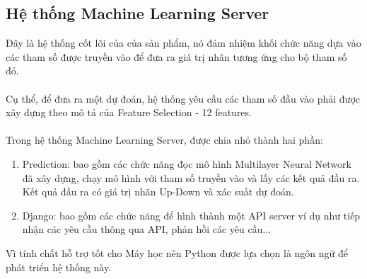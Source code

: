 \subsection{Hệ thống Machine Learning Server}
Đây là hệ thống cốt lõi của của sản phẩm, nó đảm nhiệm khối chức năng dựa vào 
các tham số được truyền vào để đưa ra giá trị nhãn tương ứng cho bộ tham số 
đó.\\\\
Cụ thể, để đưa ra một dự đoán, hệ thống yêu cầu các tham số đầu vào phải được 
xây dựng theo mô tả của Feature Selection - 12 features.\\\\
Trong hệ thống Machine Learning Server, được chia nhỏ thành hai phần:\\
\begin{enumerate}
\item Prediction: bao gồm các chức năng đọc mô hình Multilayer Neural Network 
đã xây dựng, chạy mô hình với tham số truyền vào và lấy các kết quả đầu ra.
Kết quả đầu ra có giá trị nhãn Up-Down và xác suất dự đoán.
\item Django: bao gồm các chức năng để hình thành một API server ví dụ như 
tiếp nhận các yêu cầu thông qua API, phản hồi các yêu cầu...
\end{enumerate}
Vì tính chất hỗ trợ tốt cho Máy học nên Python được lựa chọn là ngôn 
ngữ để phát triển hệ thống này.\\\\
